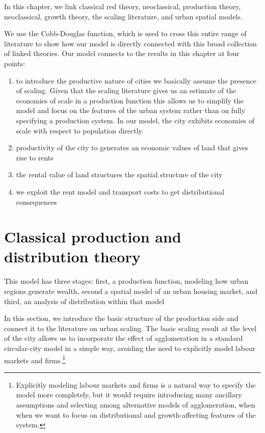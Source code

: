 \color{red}
In this chapter, we link classical red theory, neoclassical, production theory, neoclassical, growth theory, the scaling literature,  and urban spatial models. 

We use the Cobb-Douglas function, which is used to cross this entire range of literature to show how our  model is directly connected with this broad collection of linked theories. Our model connects to the results in this chapter at four points:
\begin{enumerate}
    \item to introduce  the productive nature of cities we basically assume the presence of scaling. Given  that the scaling literature gives us an estimate of the economies of scale in a production function this allows us to simplify the model and focus on the features of the urban system rather than on fully specifying a production system. In our model, the city  exhibits economies of scale with respect to population directly. 

     \item  productivity of the city to generates an economic values of land that gives rise to rents

    \item  the rental value of land structures the spatial structure of the city

    \item we exploit the rent model and transport costs to get  distributional consequences
\end{enumerate}


\section{Classical production and distribution theory}
This model has three stages: first, a production function, modeling how urban regions generate wealth,  second a spatial model of an urban housing market, and third, an analysis of distribution within that model 

In this section, we introduce the basic structure of the production side and connect it to the literature on urban scaling. The basic scaling result at the level of the city allows us to incorporate the effect of agglomeration in a standard  circular-city model in a simple way, avoiding the need to explicitly model labour markets and firms.\footnote{Explicitly modeling labour markets and firms is a natural way to specify the model more completely, but it would require introducing many ancillary assumptions and selecting among alternative models of agglomeration, when when we want to focus on distributional and growth-affecting features of the system.}


